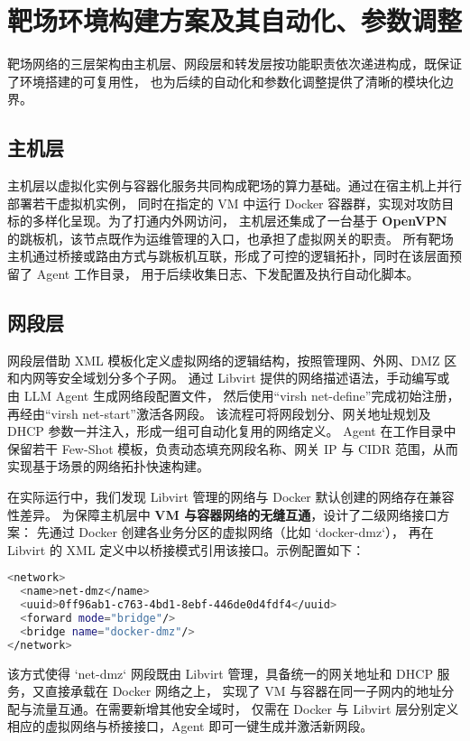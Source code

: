 \documentclass[lang=cn,10pt]{elegantbook}
\begin{document}
\section{靶场环境构建方案及其自动化、参数调整}

靶场网络的三层架构由主机层、网段层和转发层按功能职责依次递进构成，既保证了环境搭建的可复用性，
也为后续的自动化和参数化调整提供了清晰的模块化边界。


\subsection{主机层}
主机层以虚拟化实例与容器化服务共同构成靶场的算力基础。通过在宿主机上并行部署若干虚拟机实例，
同时在指定的 VM 中运行 Docker 容器群，实现对攻防目标的多样化呈现。为了打通内外网访问，
主机层还集成了一台基于 \textbf{OpenVPN }的跳板机，该节点既作为运维管理的入口，也承担了虚拟网关的职责。
所有靶场主机通过桥接或路由方式与跳板机互联，形成了可控的逻辑拓扑，同时在该层面预留了 Agent 工作目录，
用于后续收集日志、下发配置及执行自动化脚本。

\subsection{网段层}
网段层借助 XML 模板化定义虚拟网络的逻辑结构，按照管理网、外网、DMZ 区和内网等安全域划分多个子网。
通过 Libvirt 提供的网络描述语法，手动编写或由 LLM Agent 生成网络段配置文件，
然后使用“virsh net-define”完成初始注册，再经由“virsh net-start”激活各网段。
该流程可将网段划分、网关地址规划及 DHCP 参数一并注入，形成一组可自动化复用的网络定义。
Agent 在工作目录中保留若干 Few-Shot 模板，负责动态填充网段名称、网关 IP 与 CIDR 范围，从而实现基于场景的网络拓扑快速构建。

在实际运行中，我们发现 Libvirt 管理的网络与 Docker 默认创建的网络存在兼容性差异。
为保障主机层中 \textbf{VM 与容器网络的无缝互通}，设计了二级网络接口方案：
先通过 Docker 创建各业务分区的虚拟网络（比如 `docker-dmz`），
再在 Libvirt 的 XML 定义中以桥接模式引用该接口。示例配置如下：

\begin{lstlisting}[language=bash]
<network>
  <name>net-dmz</name>
  <uuid>0ff96ab1-c763-4bd1-8ebf-446de0d4fdf4</uuid>
  <forward mode="bridge"/>
  <bridge name="docker-dmz"/>
</network>
\end{lstlisting}

该方式使得 `net-dmz` 网段既由 Libvirt 管理，具备统一的网关地址和 DHCP 服务，又直接承载在 Docker 网络之上，
实现了 VM 与容器在同一子网内的地址分配与流量互通。在需要新增其他安全域时，
仅需在 Docker 与 Libvirt 层分别定义相应的虚拟网络与桥接接口，Agent 即可一键生成并激活新网段。
\end{document}
